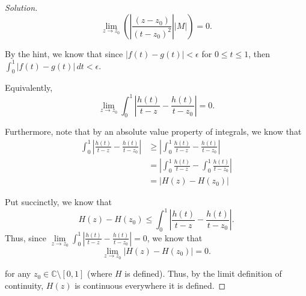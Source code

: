 \documentclass[11pt]{article}
\newcommand{\C}{\mathbb{C}}
\newenvironment{solution}
  {\renewcommand\qedsymbol{$\blacksquare$}\begin{proof}[Solution]}
  {\end{proof}}
\theoremstyle{definition}
\begin{document}
\begin{solution}
\[  \lim\limits_{z \rightarrow z_0} \left(\left| \frac{(z-z_0)}{(t-z_0)^2}\right| |M| \right) = 0.\]

By the hint, we know that since $|f(t) - g(t)| < \epsilon$ for $0 \leq t \leq 1$, then $\int_0^1 |f(t) - g(t)| \, dt  < \epsilon.$ 

Equivalently, \[ \lim\limits_{z \rightarrow z_0}\int_0^1 \left| \frac{h(t)}{t-z} - \frac{h(t)}{t-z_0} \right| = 0. \]

Furthermore, note that by an absolute value property of integrals, we know that
\begin{align*}
    \int_0^1 \left| \frac{h(t)}{t-z} - \frac{h(t)}{t-z_0} \right| &\geq \left| \int_0^1 \frac{h(t)}{t-z} - \frac{h(t)}{t-z_0}\right| \\
    &= \left| \int_0^1 \frac{h(t)}{t-z} - \int_0^1 \frac{h(t)}{t-z_0} \right| \\
    &= |H(z) - H(z_0)|
\end{align*}

Put succinctly, we know that \[ H(z) - H(z_0) \leq \int_0^1 \left| \frac{h(t)}{t-z} - \frac{h(t)}{t-z_0} \right|. \]
Thus, since $\lim\limits_{z \rightarrow z_0}\int_0^1 \left| \frac{h(t)}{t-z} - \frac{h(t)}{t-z_0} \right| = 0$, we know that 
\[ \lim\limits_{z \rightarrow z_0} |H(z) - H(z_0)| = 0.\]

for any $z_0 \in \C \setminus [0, 1]$ (where $H$ is defined). Thus, by the limit definition of continuity, $H(z)$ is continuous everywhere it is defined.
\end{solution}

\newpage
\end{document}
